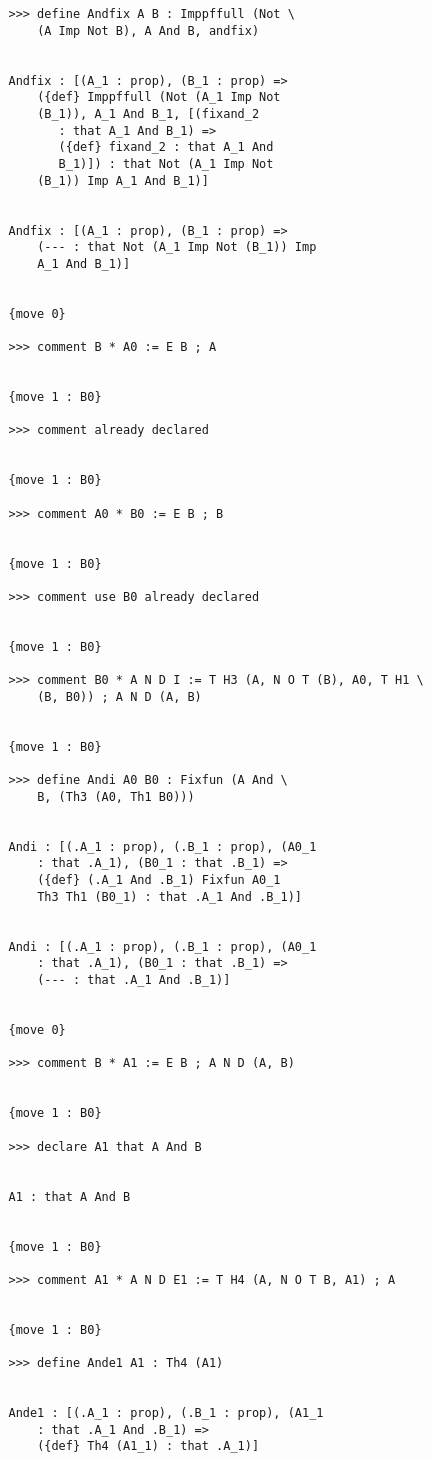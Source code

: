 \documentclass{article}
\begin{document}
\begin{verbatim}
   >>> define Andfix A B : Imppffull (Not \
       (A Imp Not B), A And B, andfix)


   Andfix : [(A_1 : prop), (B_1 : prop) => 
       ({def} Imppffull (Not (A_1 Imp Not 
       (B_1)), A_1 And B_1, [(fixand_2 
          : that A_1 And B_1) => 
          ({def} fixand_2 : that A_1 And 
          B_1)]) : that Not (A_1 Imp Not 
       (B_1)) Imp A_1 And B_1)]


   Andfix : [(A_1 : prop), (B_1 : prop) => 
       (--- : that Not (A_1 Imp Not (B_1)) Imp 
       A_1 And B_1)]


   {move 0}

   >>> comment B * A0 := E B ; A


   {move 1 : B0}

   >>> comment already declared


   {move 1 : B0}

   >>> comment A0 * B0 := E B ; B


   {move 1 : B0}

   >>> comment use B0 already declared


   {move 1 : B0}

   >>> comment B0 * A N D I := T H3 (A, N O T (B), A0, T H1 \
       (B, B0)) ; A N D (A, B)


   {move 1 : B0}

   >>> define Andi A0 B0 : Fixfun (A And \
       B, (Th3 (A0, Th1 B0)))


   Andi : [(.A_1 : prop), (.B_1 : prop), (A0_1 
       : that .A_1), (B0_1 : that .B_1) => 
       ({def} (.A_1 And .B_1) Fixfun A0_1 
       Th3 Th1 (B0_1) : that .A_1 And .B_1)]


   Andi : [(.A_1 : prop), (.B_1 : prop), (A0_1 
       : that .A_1), (B0_1 : that .B_1) => 
       (--- : that .A_1 And .B_1)]


   {move 0}

   >>> comment B * A1 := E B ; A N D (A, B)


   {move 1 : B0}

   >>> declare A1 that A And B


   A1 : that A And B


   {move 1 : B0}

   >>> comment A1 * A N D E1 := T H4 (A, N O T B, A1) ; A


   {move 1 : B0}

   >>> define Ande1 A1 : Th4 (A1)


   Ande1 : [(.A_1 : prop), (.B_1 : prop), (A1_1 
       : that .A_1 And .B_1) => 
       ({def} Th4 (A1_1) : that .A_1)]



\end{verbatim}
\end{document}
